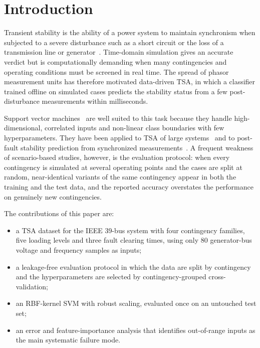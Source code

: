 \documentclass[conference]{IEEEtran}
\begin{document}
\section{Introduction}
Transient stability is the ability of a power system to maintain synchronism when subjected to a severe disturbance
such as a short circuit or the loss of a transmission line or generator~\cite{kundur2004definition,kundur1994}.
Time-domain simulation gives an accurate verdict but is computationally demanding when many contingencies and
operating conditions must be screened in real time. The spread of phasor measurement units has therefore motivated
data-driven TSA, in which a classifier trained offline on simulated cases predicts the stability status from a
few post-disturbance measurements within milliseconds.

Support vector machines~\cite{cortes1995,scholkopf2002} are well suited to this task because they handle
high-dimensional, correlated inputs and non-linear class boundaries with few hyperparameters. They have been applied
to TSA of large systems~\cite{moulin2004} and to post-fault stability prediction from synchronized
measurements~\cite{gomez2011}. A frequent weakness of scenario-based studies, however, is the evaluation protocol:
when every contingency is simulated at several operating points and the cases are split at random, near-identical
variants of the same contingency appear in both the training and the test data, and the reported accuracy
overstates the performance on genuinely new contingencies.

The contributions of this paper are:
\begin{itemize}
  \item a TSA dataset for the IEEE 39-bus system with four contingency families, five loading levels and three
        fault clearing times, using only 80 generator-bus voltage and frequency samples as inputs;
  \item a leakage-free evaluation protocol in which the data are split by contingency and the hyperparameters are
        selected by contingency-grouped cross-validation;
  \item an RBF-kernel SVM with robust scaling, evaluated once on an untouched test set;
  \item an error and feature-importance analysis that identifies out-of-range inputs as the main systematic
        failure mode.
\end{itemize}
\end{document}
